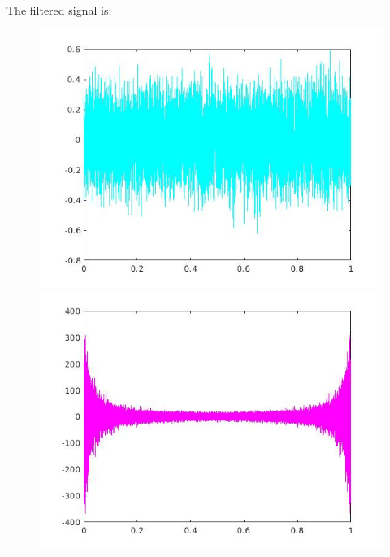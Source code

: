 \documentclass[a4paper,11pt]{article}
\begin{document}
The filtered signal is:

\begin{figure}[!hp]
\centering
\begin{minipage}{.5\textwidth}
  \centering
  \includegraphics[width=1\linewidth]{images/lab1_28.jpg}
\end{minipage}%
\begin{minipage}{.5\textwidth}
  \centering
  \includegraphics[width=1\linewidth]{images/lab1_26.jpg}
\end{minipage}
\end{figure}

\newpage
\end{document}
